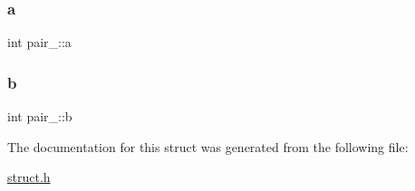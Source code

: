 \subsubsection{\texorpdfstring{a}{a}}
{\footnotesize\ttfamily int pair\+\_\+\+::a}

\mbox{\label{structpair___a1ede8bd28d7cadae8ddf1ff155482737}} 
\subsubsection{\texorpdfstring{b}{b}}
{\footnotesize\ttfamily int pair\+\_\+\+::b}



The documentation for this struct was generated from the following file\+:\begin{DoxyCompactItemize}
\item 
\hyperlink{struct_8h}{struct.\+h}\end{DoxyCompactItemize}
